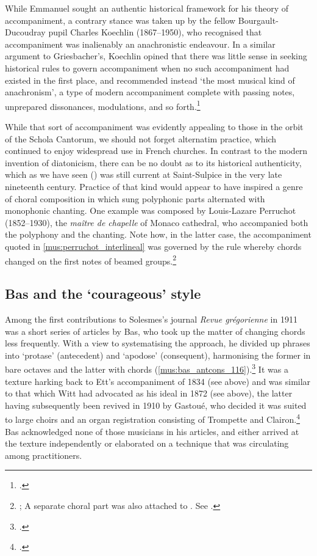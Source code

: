 While Emmanuel sought an authentic historical framework for his theory of accompaniment, a contrary stance was taken up by the fellow Bourgault-Ducoudray pupil Charles Koechlin (1867--1950), who recognised that accompaniment was inalienably an anachronistic endeavour.
In a similar argument to Griesbacher's, Koechlin opined that there was little sense in seeking historical rules to govern accompaniment when no such accompaniment had existed in the first place, and recommended instead `the most musical kind of anachronism', a type of modern accompaniment complete with passing notes, unprepared dissonances, modulations, and so forth.\footcite[382--3]{Lessmannanachronismemusicalaccompagnement2019}

While that sort of accompaniment was evidently appealing to those in the orbit of the Schola Cantorum, we should not forget alternatim practice, which continued to enjoy widespread use in French churches.
In contrast to the modern invention of diatonicism, there can be no doubt as to its historical authenticity, which as we have seen () was still current at Saint-Sulpice in the very late nineteenth century.
Practice of that kind would appear to have inspired a genre of choral composition in which sung polyphonic parts alternated with monophonic chanting.
One example was composed by Louis-Lazare Perruchot (1852--1930), the \emph{maître de chapelle} of Monaco cathedral, who accompanied both the polyphony and the chanting.
Note how, in the latter case, the accompaniment quoted in \cref{mus:perruchot_interlineal} was governed by the rule whereby chords changed on the first notes of beamed groups.\footnote{\cite[1]{PerruchotMessediteAnges1910}; A separate choral part was also attached to \tsg{}. See \cite[2]{PerruchotSupplementMessedite1910}.}

\subsection{Bas and the `courageous' style}
\label{hl:bas_apodose}%
Among the first contributions to Solesmes's journal \emph{Revue grégorienne} in 1911 was a short series of articles by Bas, who took up the matter of changing chords less frequently.
With a view to systematising the approach, he divided up phrases into `protase' (antecedent) and `apodose' (consequent), harmonising the former in bare octaves and the latter with chords (\cref{mus:bas_antcons_116}).\footcite[116]{Bassimplicitedansaccompagnement1911}
It was a texture harking back to Ett's accompaniment of 1834 (see  above) and was similar to that which Witt had advocated as his ideal in 1872 (see  above), the latter having subsequently been revived in 1910 by Gastoué, who decided it was suited to large choirs and an organ registration consisting of Trompette and Clairon.\footcite[87]{GastoueTraiteharmonisationchant1910}
Bas acknowledged none of those musicians in his articles, and either arrived at the texture independently or elaborated on a technique that was circulating among practitioners.

